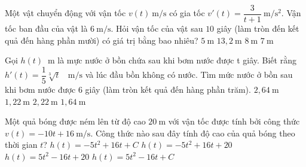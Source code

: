 \begin{ex}%
	Một vật chuyển động với vận tốc $v(t)~\mathrm{m/s}$ có gia tốc $v'(t)=\dfrac{3}{t+1}~\mathrm{m/s^2}$. Vận tốc ban đầu của vật là $6~\mathrm{m/s} $. Hỏi vận tốc của vật sau $10$ giây (làm tròn đến kết quả đến  hàng phần mười) có giá trị bằng bao nhiêu?
	 \choice
		 {$5~\mathrm{m}$}
		 {\True $13{,}2~\mathrm{m}$}
		{$8~\mathrm{m}$} 
		{$7~\mathrm{m}$} 
\end{ex}

\begin{ex}%
	Gọi $h(t)$ $~\mathrm{m}$ là mực nước  ở bồn chứa sau khi bơm nước được t giây. Biết rằng \break$h'(t)=\dfrac{1}{5}\sqrt[3]t\text{ }~\mathrm{m/s}$
	và lúc đầu bồn không có nước. Tìm mức nước ở  bồn sau khi bơm nước được $6$ giây (làm tròn kết quả đến hàng phần trăm).
	 \choice
		{$2{,}64~\mathrm{m}$} 
		{$1{,}22~\mathrm{m}$} 
		{$2{,}22~\mathrm{m}$} 
		{\True  $1{,}64~\mathrm{m}$}
\end{ex}

\begin{ex}%
	Một quả bóng được ném lên từ độ cao $20~\mathrm{m}$ với vận tốc được tính bởi công thức\break$v(t)=-10t+16~\mathrm{m/s}$. Công  thức nào sau đây tính độ cao của quả bóng theo thời gian $t$?
	\choice 
		{$h(t)=-5t^2+16t+C$} 
		{\True $h(t)=-5t^2+16t+20$} 
		{$h(t)=5t^2-16t+20$} 
		{$h(t)=5t^2-16t+C$} 
\end{ex}

